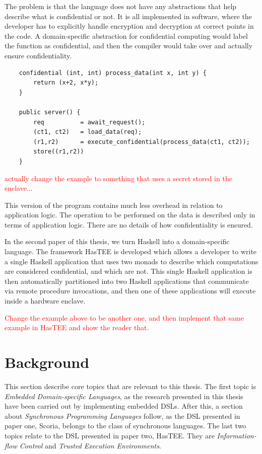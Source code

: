 The problem is that the language does not have any abstractions that help describe what is confidential or not. It is all
implemented in software, where the developer has to explicitly handle encryption and decryption at correct points in the
code. A domain-specific abstraction for confidential computing would label the function  as confidential,
and then the compiler would take over and actually ensure confidentiality.

\begin{verbatim}
    confidential (int, int) process_data(int x, int y) {
        return (x+2, x*y);
    }

    public server() {
        req          = await_request();
        (ct1, ct2)   = load_data(req);
        (r1,r2)      = execute_confidential(process_data(ct1, ct2));
        store((r1,r2))
    }
\end{verbatim}

\textcolor{red}{actually change the example to something that uses a secret stored in the enclave...}

This version of the program contains much less overhead in relation to application logic. The operation to be performed
on the data is described only in terms of application logic. There are no details of how confidentiality is ensured.

In the second paper of this thesis, we turn Haskell into a domain-specific language. The framework HasTEE is developed
which allows a developer to write a single Haskell application that uses two monads to describe which computations are
considered confidential, and which are not. This single Haskell application is then automatically partitioned into two
Haskell applications that communicate via remote procedure invocations, and then one of these applications will execute
inside a hardware enclave.

\textcolor{red}{Change the example above to be another one, and then implement that same example in HasTEE and show the reader that.}

\section{Background}

This section describe core topics that are relevant to this thesis. The first topic is \textit{Embedded Domain-specific Languages},
as the research presented in this thesis have been carried out by implementing embedded DSLs.
After this, a section about \textit{Synchronous Programming Languages} follow, as the DSL presented in paper one, Scoria, belongs
to the class of synchronous languages.
The last two topics relate to the DSL presented in paper two, HasTEE. They are \textit{Information-flow Control} and
\textit{Trusted Execution Environments}.


